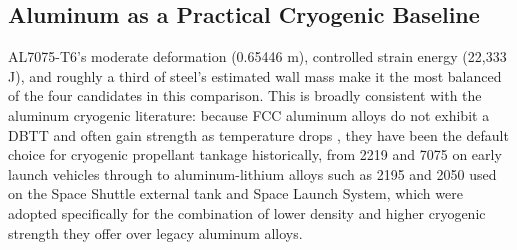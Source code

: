 \documentclass[conference]{IEEEtran}
\begin{document}
\subsection{Aluminum as a Practical Cryogenic Baseline}
AL7075-T6's moderate deformation (0.65446 m), controlled strain energy (22{,}333 J), and roughly a third of steel's estimated wall mass make it the most balanced of the four candidates in this comparison. This is broadly consistent with the aluminum cryogenic literature: because FCC aluminum alloys do not exhibit a DBTT and often gain strength as temperature drops \cite{kaufman1999}, they have been the default choice for cryogenic propellant tankage historically, from 2219 and 7075 on early launch vehicles through to aluminum-lithium alloys such as 2195 and 2050 used on the Space Shuttle external tank and Space Launch System, which were adopted specifically for the combination of lower density and higher cryogenic strength they offer over legacy aluminum alloys.
\end{document}
